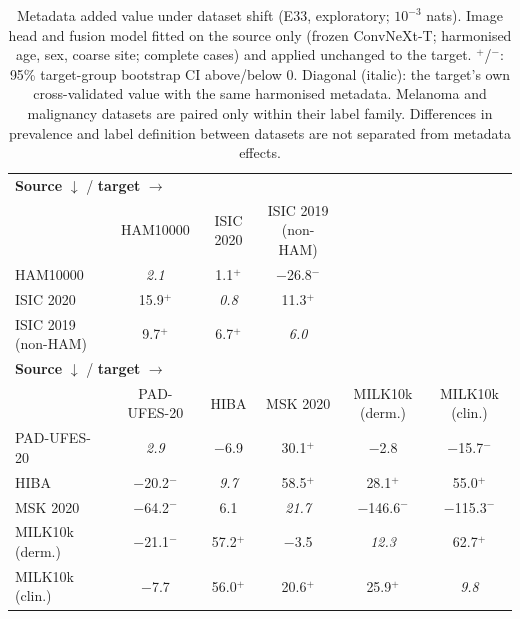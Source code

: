 \begin{table}[tp]\centering\footnotesize
\caption{Metadata added value under dataset shift (E33, exploratory; $10^{-3}$ nats). Image head and fusion model fitted on the source only (frozen ConvNeXt-T; harmonised age, sex, coarse site; complete cases) and applied unchanged to the target. $^{+}$/$^{-}$: 95\% target-group bootstrap CI above/below 0. Diagonal (italic): the target's own cross-validated value with the same harmonised metadata. Melanoma and malignancy datasets are paired only within their label family. Differences in prevalence and label definition between datasets are not separated from metadata effects.}\label{tab:shift}
\setlength{\tabcolsep}{3pt}
\begin{tabular}{lccccc}\toprule
\multicolumn{4}{l}{\textbf{Source} $\downarrow$ / \textbf{target} $\rightarrow$}\\
 & HAM10000 & ISIC 2020 & ISIC 2019 (non-HAM)\\\midrule
HAM10000 & \textit{2.1} & 1.1$^{+}$ & \ensuremath{-}26.8$^{-}$\\
ISIC 2020 & 15.9$^{+}$ & \textit{0.8} & 11.3$^{+}$\\
ISIC 2019 (non-HAM) & 9.7$^{+}$ & 6.7$^{+}$ & \textit{6.0}\\
\midrule
\multicolumn{6}{l}{\textbf{Source} $\downarrow$ / \textbf{target} $\rightarrow$}\\
 & PAD-UFES-20 & HIBA & MSK 2020 & MILK10k (derm.) & MILK10k (clin.)\\\midrule
PAD-UFES-20 & \textit{2.9} & \ensuremath{-}6.9 & 30.1$^{+}$ & \ensuremath{-}2.8 & \ensuremath{-}15.7$^{-}$\\
HIBA & \ensuremath{-}20.2$^{-}$ & \textit{9.7} & 58.5$^{+}$ & 28.1$^{+}$ & 55.0$^{+}$\\
MSK 2020 & \ensuremath{-}64.2$^{-}$ & 6.1 & \textit{21.7} & \ensuremath{-}146.6$^{-}$ & \ensuremath{-}115.3$^{-}$\\
MILK10k (derm.) & \ensuremath{-}21.1$^{-}$ & 57.2$^{+}$ & \ensuremath{-}3.5 & \textit{12.3} & 62.7$^{+}$\\
MILK10k (clin.) & \ensuremath{-}7.7 & 56.0$^{+}$ & 20.6$^{+}$ & 25.9$^{+}$ & \textit{9.8}\\
\bottomrule\end{tabular}\end{table}
